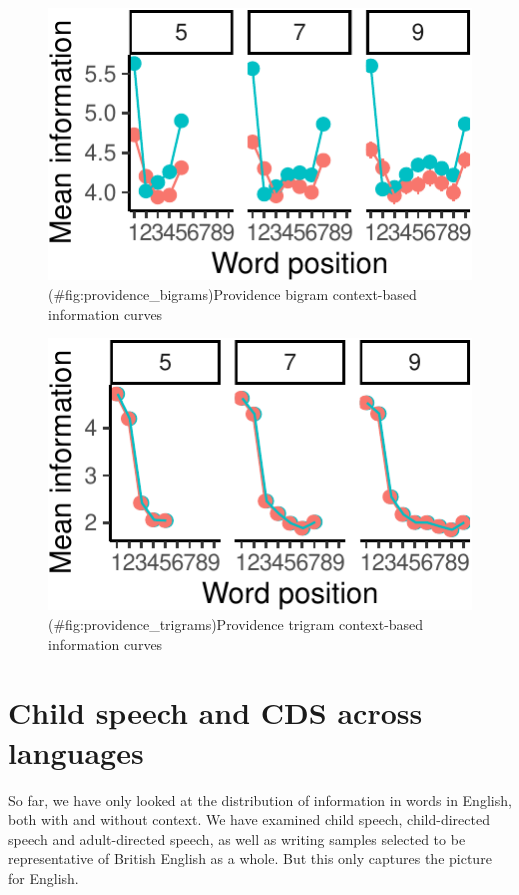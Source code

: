 \documentclass[man,floatsintext]{apa6}
\begin{document}
\begin{figure}
\centering
\includegraphics{figs/providence_bigrams-1.pdf}
\caption{(\#fig:providence\_bigrams)Providence bigram context-based information curves}
\end{figure}

\begin{figure}
\centering
\includegraphics{figs/providence_trigrams-1.pdf}
\caption{(\#fig:providence\_trigrams)Providence trigram context-based information curves}
\end{figure}

\hypertarget{child-speech-and-cds-across-languages}{%
\section{Child speech and CDS across languages}\label{child-speech-and-cds-across-languages}}

So far, we have only looked at the distribution of information in words in English, both with and without context. We have examined child speech, child-directed speech and adult-directed speech, as well as writing samples selected to be representative of British English as a whole. But this only captures the picture for English.
\end{document}
